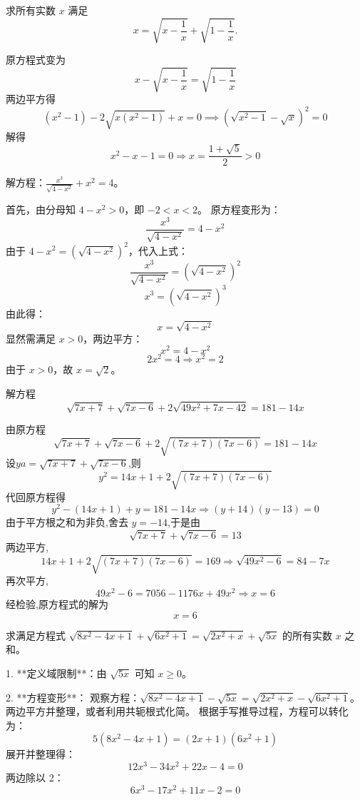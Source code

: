 \begin{questions}
    \question 求所有实数 $x$ 满足
    \[
    x = \sqrt{x - \frac{1}{x}} + \sqrt{1 - \frac{1}{x}}.
    \]
    \begin{solution}
        原方程式变为
        \[
        x - \sqrt{x - \frac{1}{x}} = \sqrt{1 - \frac{1}{x}}
        \]
        两边平方得
        \[
        (x^2-1)-2\sqrt{x(x^2-1)}+x=0 \implies (\sqrt{x^2-1}-\sqrt{x})^2=0
        \]
        解得
        \[
        x^2 - x - 1 = 0 \Rightarrow x = \frac{1+\sqrt{5}}{2} >0
        \]
    \end{solution}

    \question 解方程：$\frac{x^3}{\sqrt{4 - x^2}} + x^2 = 4$。

\begin{solution}
首先，由分母知 $4 - x^2 > 0$，即 $-2 < x < 2$。
原方程变形为：
\[
\frac{x^3}{\sqrt{4 - x^2}} = 4 - x^2
\]
由于 $4 - x^2 = \left(\sqrt{4 - x^2}\right)^2$，代入上式：
\[
\frac{x^3}{\sqrt{4 - x^2}} = \left(\sqrt{4 - x^2}\right)^2
\]
\[
x^3 = \left(\sqrt{4 - x^2}\right)^3
\]
由此得：
\[
x = \sqrt{4 - x^2}
\]
显然需满足 $x > 0$，两边平方：
\[
x^2 = 4 - x^2
\]
\[
2x^2 = 4 \Rightarrow x^2 = 2
\]
由于 $x > 0$，故 $x = \sqrt{2}$。
\end{solution}

    \question 解方程
    \[
    \sqrt{7x+7}+\sqrt{7x-6}+2\sqrt{49x^2+7x-42}=181-14x
    \]
    \begin{solution}
        由原方程
        \[
        \sqrt{7x+7}+\sqrt{7x-6}+2\sqrt{(7x+7)(7x-6)}=181-14x
        \]
        设$ya=\sqrt{7x+7}+\sqrt{7x-6}$,则
        \[
        y^2=14x+1+2\sqrt{(7x+7)(7x-6)}
        \]
        代回原方程得
        \[
        y^2-(14x+1)+y=181-14x \Rightarrow (y+14)(y-13)=0
        \]
        由于平方根之和为非负,舍去 $y=-14$,于是由
        \[
        \sqrt{7x+7}+\sqrt{7x-6}=13
        \]
        两边平方,
        \[
        14x+1+2\sqrt{(7x+7)(7x-6)}=169 \Rightarrow \sqrt{49x^2-6}=84-7x
        \]
        再次平方,
        \[
        49x^2-6=7056-1176x+49x^2 \Rightarrow x=6
        \]
        经检验,原方程式的解为
        \[
        x=6
        \]
    \end{solution}

    \question 求满足方程式 $\sqrt{8x^2 - 4x + 1} + \sqrt{6x^2 + 1} = \sqrt{2x^2 + x} + \sqrt{5x}$ 的所有实数 $x$ 之和。
\begin{solution}
1. **定义域限制**：由 $\sqrt{5x}$ 可知 $x \ge 0$。

2. **方程变形**：
   观察方程：$\sqrt{8x^2 - 4x + 1} - \sqrt{5x} = \sqrt{2x^2 + x} - \sqrt{6x^2 + 1}$。
   两边平方并整理，或者利用共轭根式化简。
   根据手写推导过程，方程可以转化为：
   \[ 5(8x^2 - 4x + 1) = (2x + 1)(6x^2 + 1) \]
   展开并整理得：
   \[ 12x^3 - 34x^2 + 22x - 4 = 0 \]
   两边除以 2：
   \[ 6x^3 - 17x^2 + 11x - 2 = 0 \]


\end{solution}
\end{questions}
